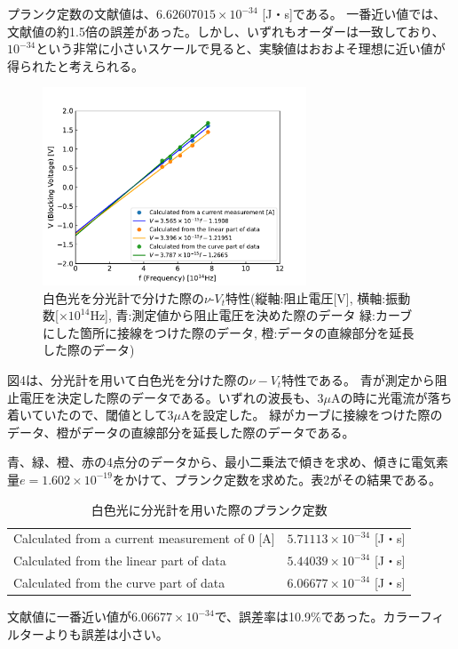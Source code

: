 \documentclass[a4paper,12pt]{jsarticle}
\begin{document}
プランク定数の文献値は、$6.62607015\times 10^{-34}$ [J・s]である。
一番近い値では、文献値の約1.5倍の誤差があった。しかし、いずれもオーダーは一致しており、$10^{-34}$という非常に小さいスケールで見ると、実験値はおおよそ理想に近い値が得られたと考えられる。

\begin{figure}
  \centering
  \includegraphics[width=0.7\textwidth]{figs/fitting2.pdf}
  \caption{白色光を分光計で分けた際の$\nu$-$V_t$特性(縦軸:阻止電圧[V], 横軸:振動数[$\times 10^{14}$Hz], 青:測定値から阻止電圧を決めた際のデータ 緑:カーブにした箇所に接線をつけた際のデータ, 橙:データの直線部分を延長した際のデータ)}
\end{figure}
図4は、分光計を用いて白色光を分けた際の$\nu-V_t$特性である。
青が測定から阻止電圧を決定した際のデータである。いずれの波長も、3$\mu$Aの時に光電流が落ち着いていたので、閾値として3$\mu$Aを設定した。
緑がカーブに接線をつけた際のデータ、橙がデータの直線部分を延長した際のデータである。

青、緑、橙、赤の4点分のデータから、最小二乗法で傾きを求め、傾きに電気素量$e = 1.602\times 10^{-19}$をかけて、プランク定数を求めた。表2がその結果である。
\begin{table}[htbp]
  \centering
  \caption{白色光に分光計を用いた際のプランク定数}
    \begin{tabular}{ll}
    \toprule
    Calculated from a current measurement of 0 [A] & $5.71113\times 10^{-34}$ [J・s] \\
    Calculated from the linear part of data & $5.44039\times 10^{-34}$ [J・s] \\
    Calculated from the curve part of data & $6.06677\times 10^{-34}$ [J・s] \\
    \bottomrule
    \end{tabular}%
  \label{tab:addlabel}%
\end{table}%
文献値に一番近い値が$6.06677\times 10^{-34}$で、誤差率は10.9\%であった。カラーフィルターよりも誤差は小さい。
\end{document}
